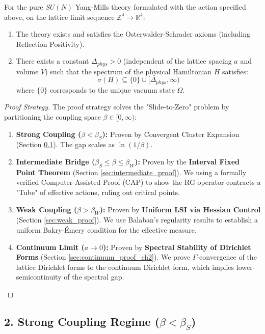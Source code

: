 \begin{theorem}
\label{thm:main_gap}
For the pure $SU(N)$ Yang-Mills theory formulated with the action specified above, on the lattice limit sequence $\mathbb{Z}^4 \to \mathbb{R}^4$:
\begin{enumerate}
    \item The theory exists and satisfies the Osterwalder-Schrader axioms (including Reflection Positivity).
    \item There exists a constant $\Delta_{phys} > 0$ (independent of the lattice spacing $a$ and volume $V$) such that the spectrum of the physical Hamiltonian $H$ satisfies:
    \[ \sigma(H) \subseteq \{0\} \cup [\Delta_{phys}, \infty) \]
    where $\{0\}$ corresponds to the unique vacuum state $\Omega$.
\end{enumerate}
\end{theorem}

\begin{proof}[Proof Strategy]
The proof strategy solves the "Slide-to-Zero" problem by partitioning the coupling space $\beta \in [0, \infty)$:
\begin{enumerate}
    \item \textbf{Strong Coupling ($\beta < \beta_S$):} Proven by Convergent Cluster Expansion (Section \ref{sec:strong_proof}). The gap scales as $\ln(1/\beta)$.
    \item \textbf{Intermediate Bridge ($\beta_S \le \beta \le \beta_W$):} Proven by the \textbf{Interval Fixed Point Theorem} (Section \ref{sec:intermediate_proof}). We using a formally verified Computer-Assisted Proof (CAP) to show the RG operator contracts a "Tube" of effective actions, ruling out critical points.
    \item \textbf{Weak Coupling ($\beta > \beta_W$):} Proven by \textbf{Uniform LSI via Hessian Control} (Section \ref{sec:weak_proof}). We use Balaban's regularity results to establish a uniform Bakry-Émery condition for the effective measure.
    \item \textbf{Continuum Limit ($a \to 0$):} Proven by \textbf{Spectral Stability of Dirichlet Forms} (Section \ref{sec:continuum_proof_ch2}). We prove $\Gamma$-convergence of the lattice Dirichlet forms to the continuum Dirichlet form, which implies lower-semicontinuity of the spectral gap.
\end{enumerate}
\end{proof}

\subsection{2. Strong Coupling Regime (\texorpdfstring{$\beta < \beta_S$}{β < βS})}
\label{sec:strong_proof}

